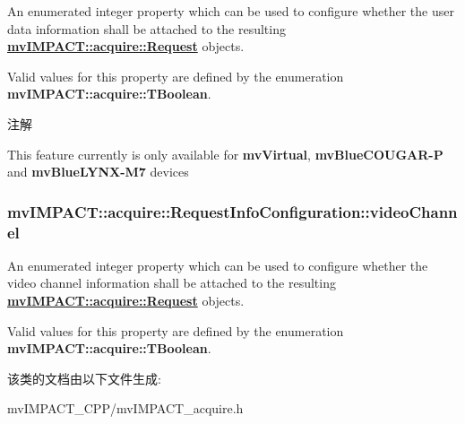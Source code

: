 An enumerated integer property which can be used to configure whether the user data information shall be attached to the resulting {\bfseries \hyperlink{classmv_i_m_p_a_c_t_1_1acquire_1_1_request}{mv\+I\+M\+P\+A\+C\+T\+::acquire\+::\+Request}} objects. 

Valid values for this property are defined by the enumeration {\bfseries mv\+I\+M\+P\+A\+C\+T\+::acquire\+::\+T\+Boolean}. \begin{DoxyNote}{注解}

\begin{DoxyItemize}
\item This feature currently is only available for {\bfseries mv\+Virtual}, {\bfseries mv\+Blue\+C\+O\+U\+G\+A\+R-\/\+P} and {\bfseries mv\+Blue\+L\+Y\+N\+X-\/\+M7} devices 
\end{DoxyItemize}
\end{DoxyNote}
\hypertarget{classmv_i_m_p_a_c_t_1_1acquire_1_1_request_info_configuration_a69d84f98843b1ab417e6d18a4038a9bd}{
\subsubsection[{video\+Channel}]{ mv\+I\+M\+P\+A\+C\+T\+::acquire\+::\+Request\+Info\+Configuration\+::video\+Channel}}\label{classmv_i_m_p_a_c_t_1_1acquire_1_1_request_info_configuration_a69d84f98843b1ab417e6d18a4038a9bd}


An enumerated integer property which can be used to configure whether the video channel information shall be attached to the resulting {\bfseries \hyperlink{classmv_i_m_p_a_c_t_1_1acquire_1_1_request}{mv\+I\+M\+P\+A\+C\+T\+::acquire\+::\+Request}} objects. 

Valid values for this property are defined by the enumeration {\bfseries mv\+I\+M\+P\+A\+C\+T\+::acquire\+::\+T\+Boolean}. 

该类的文档由以下文件生成\+:\begin{DoxyCompactItemize}
\item 
mv\+I\+M\+P\+A\+C\+T\+\_\+\+C\+P\+P/mv\+I\+M\+P\+A\+C\+T\+\_\+acquire.\+h\end{DoxyCompactItemize}
